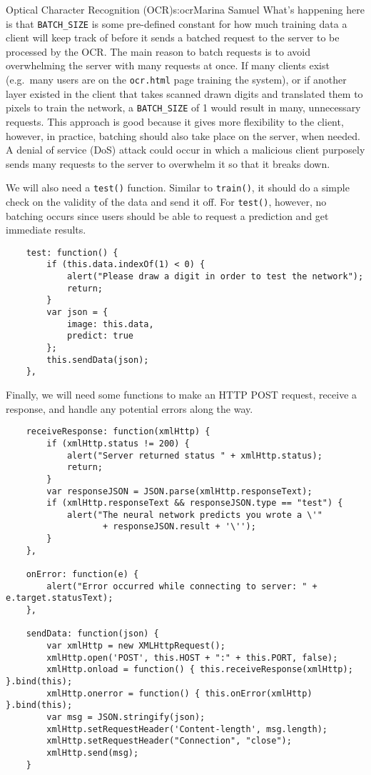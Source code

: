 \begin{aosachapter}{Optical Character Recognition (OCR)}{s:ocr}{Marina Samuel}
What's happening here is that \texttt{BATCH\_SIZE} is some pre-defined
constant for how much training data a client will keep track of before
it sends a batched request to the server to be processed by the OCR. The
main reason to batch requests is to avoid overwhelming the server with
many requests at once. If many clients exist (e.g.~many users are on the
\texttt{ocr.html} page training the system), or if another layer existed
in the client that takes scanned drawn digits and translated them to
pixels to train the network, a \texttt{BATCH\_SIZE} of 1 would result in
many, unnecessary requests. This approach is good because it gives more
flexibility to the client, however, in practice, batching should also
take place on the server, when needed. A denial of service (DoS) attack
could occur in which a malicious client purposely sends many requests to
the server to overwhelm it so that it breaks down.

We will also need a \texttt{test()} function. Similar to
\texttt{train()}, it should do a simple check on the validity of the
data and send it off. For \texttt{test()}, however, no batching occurs
since users should be able to request a prediction and get immediate
results.

\begin{verbatim}
    test: function() {
        if (this.data.indexOf(1) < 0) {
            alert("Please draw a digit in order to test the network");
            return;
        }
        var json = {
            image: this.data,
            predict: true
        };
        this.sendData(json);
    },
\end{verbatim}

Finally, we will need some functions to make an HTTP POST request,
receive a response, and handle any potential errors along the way.

\begin{verbatim}
    receiveResponse: function(xmlHttp) {
        if (xmlHttp.status != 200) {
            alert("Server returned status " + xmlHttp.status);
            return;
        }
        var responseJSON = JSON.parse(xmlHttp.responseText);
        if (xmlHttp.responseText && responseJSON.type == "test") {
            alert("The neural network predicts you wrote a \'" 
                   + responseJSON.result + '\'');
        }
    },

    onError: function(e) {
        alert("Error occurred while connecting to server: " + e.target.statusText);
    },

    sendData: function(json) {
        var xmlHttp = new XMLHttpRequest();
        xmlHttp.open('POST', this.HOST + ":" + this.PORT, false);
        xmlHttp.onload = function() { this.receiveResponse(xmlHttp); }.bind(this);
        xmlHttp.onerror = function() { this.onError(xmlHttp) }.bind(this);
        var msg = JSON.stringify(json);
        xmlHttp.setRequestHeader('Content-length', msg.length);
        xmlHttp.setRequestHeader("Connection", "close");
        xmlHttp.send(msg);
    }
\end{verbatim}


\end{aosachapter}
